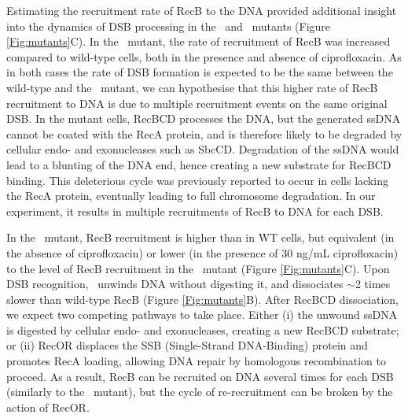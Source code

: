 Estimating the recruitment rate of RecB to the DNA provided additional insight into the dynamics of DSB processing in the \dreca\ and \teneighty\ mutants (Figure \ref{Fig:mutants}C). In the \dreca\ mutant, the rate of recruitment of RecB was increased compared to wild-type cells, both in the presence and absence of ciprofloxacin. As in both cases the rate of DSB formation is expected to be the same between the wild-type and the \dreca\ mutant, we can hypothesise that this higher rate of RecB recruitment to DNA is due to multiple recruitment events on the same original DSB. In the mutant cells, RecBCD processes the DNA, but the generated ssDNA cannot be coated with the RecA protein, and is therefore likely to be degraded by cellular endo- and exonucleases such as SbcCD. Degradation of the ssDNA would lead to a blunting of the DNA end, hence creating a new substrate for RecBCD binding. This deleterious cycle was previously reported to occur in cells lacking the RecA protein, eventually leading to full chromosome degradation\cite{Capaldo1975,Skarstad1993}. In our experiment, it results in multiple recruitments of RecB to DNA for each DSB.

In the \teneighty\ mutant, RecB recruitment is higher than in WT cells, but equivalent (in the absence of ciprofloxacin) or lower (in the presence of 30 ng/mL ciprofloxacin) to the level of RecB recruitment in the \dreca\ mutant (Figure \ref{Fig:mutants}C). Upon DSB recognition, \teneighty\ unwinds DNA without digesting it, and dissociates $\sim$2 times slower than wild-type RecB (Figure \ref{Fig:mutants}B). After RecBCD dissociation, we expect two competing pathways to take place. Either (i) the unwound ssDNA is digested by cellular endo- and exonucleases, creating a new RecBCD substrate; or (ii) RecOR displaces the SSB (Single-Strand DNA-Binding) protein and promotes RecA loading, allowing DNA repair by homologous recombination to proceed. As a result, RecB can be recruited on DNA several times for each DSB (similarly to the \dreca\ mutant), but the cycle of re-recruitment can be broken by the action of RecOR.


